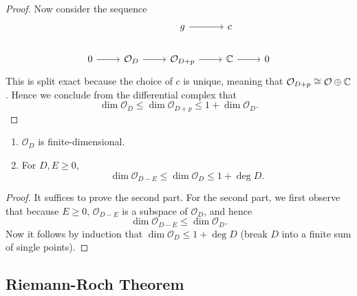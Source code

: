 \documentclass{article}
\begin{document}
{\begin{proof}
    Now consider the sequence
\[\begin{tikzcd}
	&& g & c \\
	0 & {\mathcal{O}_{D}} & {\mathcal{O}_{D+p}} & \Cbb & 0
	\arrow[from=2-1, to=2-2]
	\arrow[from=2-2, to=2-3]
	\arrow[from=2-3, to=2-4]
	\arrow[from=2-4, to=2-5]
	\arrow[from=1-3, to=1-4]
\end{tikzcd}\]
This is split exact because the choice of $c$ is unique, meaning that $\mathcal{O}_{D+p} \cong \mathcal{O} \oplus \mathbb{C}$. Hence we conclude from the differential complex that 
 \[\dim \mathcal{O}_D \leq \dim \mathcal{O}_{D + p} \leq 1 + \dim \mathcal{O}_D.\]
\end{proof}

\begin{corollary}
    \begin{enumerate}
        \item $\mathcal{O}_D$ is finite-dimensional.
        \item For $D, E \geq 0$, 
        \[\dim \mathcal{O}_{D-E} \leq \dim \mathcal{O}_D \leq 1 + \deg D.\]
    \end{enumerate}
\end{corollary}

\begin{proof}
It suffices to prove the second part. For the second part, we first observe that because $E \geq 0$, $\mathcal{O}_{D - E}$ is a subspace of $\mathcal{O}_D$, and hence
\[\dim \mathcal{O}_{D - E} \leq \dim \mathcal{O}_D.\]
Now it follows by induction that $\dim \mathcal{O}_D \leq 1 + \deg D$ (break $D$ into a finite sum of single points).
    
\end{proof}

\subsection{Riemann-Roch Theorem}

}
\end{document}
